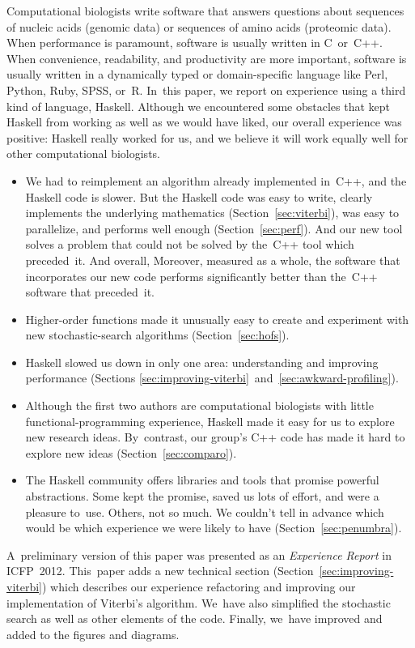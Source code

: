 \documentclass[]{jfp1}
\newcommand\secref[1]{Section~\ref{sec:#1}}
\newcommand\secrefpair[3][and]{Sections \ref{sec:#2}~#1~\ref{sec:#3}}
\begin{document}
Computational biologists write software that answers questions about 
sequences of nucleic acids (genomic data) or sequences of amino 
acids (proteomic data). 
When performance is paramount,
software is usually written in C~or~C++. 
When convenience, readability, and
productivity are more important,
software is usually written in a dynamically typed
or domain-specific language like
Perl, Python, Ruby, SPSS, or~R.
In~this paper, we report on experience using a third kind of language,
Haskell.
Although we encountered some obstacles that kept Haskell from working
as well as we would have liked, our overall experience was positive:
Haskell really worked for us, and we believe it will work equally well
for other computational biologists.
\begin{itemize}
\item
We had to reimplement an
algorithm already implemented in~C++, 
and the Haskell code is slower.
But the Haskell code was easy to write,     %
clearly implements the underlying mathematics
 (\secref{viterbi}),
 was easy to parallelize,
and performs well enough
(\secref{perf}).
\ifpagetuning
  And our new tool solves a problem that could not be solved by
  the~C++ tool which preceded~it.
\else
  \ifpagetuning
  And overall,
  \else
  Moreover, measured as a whole, 
  \fi
  the software that incorporates our new
  code 
  performs significantly
  better than the~C++ software that preceded~it.
\fi
\item
Higher-order functions made it unusually easy to
create and experiment with new stochastic-search algorithms
(\secref{hofs}).
\item
Haskell slowed us down in only one area:  understanding and
improving
performance (\secrefpair{improving-viterbi}{awkward-profiling}).
\item
Although the first two authors are computational
biologists
with little functional-programming experience,
Haskell made it easy for us to explore new research ideas.
By~contrast,
our group's C++ code has 
made it hard to explore
new ideas
(\secref{comparo}).
\item
The Haskell community offers libraries and tools that
promise powerful abstractions.
Some kept the promise, saved us lots of effort, and were a pleasure
to~use.
Others, not so much.
We couldn't tell in advance which 
\ifpagetuning
would be which
\else
experience we were likely to have
\fi
 (\secref{penumbra}).
\end{itemize}
A~preliminary version of this
paper \citep{daniels:haskell-in-bio:2012} was presented as 
an \emph{Experience Report} in ICFP~2012.
This~paper adds a new technical section (\secref{improving-viterbi})
which describes our experience 
refactoring and improving our implementation of Viterbi's 
\citeyearpar{Viterbi:1967hq}
algorithm.
We~have also simplified the stochastic search as well as other elements of
the code.
Finally, we~have improved and added to the figures and diagrams.
\end{document}
